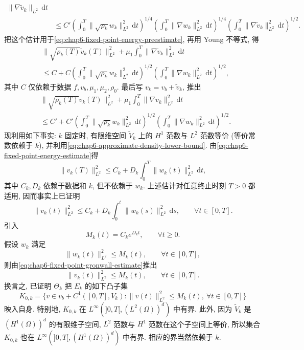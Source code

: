 \begin{sloppypar}
\begin{itemize}
\[\begin{aligned}
 \|\nabla\widetilde v_k\|_{L^2}\,\mathrm dt\\
 &\leq C'
 \left(\int_0^T\|\sqrt{\rho_k}w_k\|_{L^2}^2\,\mathrm dt\right)^{1/4}
 \left(\int_0^T\|\nabla w_k\|_{L^2}^2\,\mathrm dt\right)^{1/4}
 \left(\int_0^T\|\nabla\widetilde v_k\|_{L^2}^2\,\mathrm dt\right)^{1/2}.
 \end{aligned}
 \]
 把这个估计用于\eqref{eq:chap6-fixed-point-energy-preestimate}, 再用 Young 不等式, 得
 \[
 \begin{aligned}
 &\|\sqrt{\rho_k(T)}\widetilde v_k(T)\|_{L^2}^2
 +\mu_1\int_0^T\|\nabla\widetilde v_k\|_{L^2}^2\,\mathrm dt\\
 &\leq C+C
 \left(\int_0^T\|\sqrt{\rho_k}w_k\|_{L^2}^2\,\mathrm dt\right)^{1/2}
 \left(\int_0^T\|\nabla w_k\|_{L^2}^2\,\mathrm dt\right)^{1/2},
 \end{aligned}
 \]
 其中 $C$ 仅依赖于数据 $f,v_b,\mu_1,\mu_2,\rho_0$. 最后写 $v_k=v_b+\widetilde v_k$, 推出
 \begin{equation}
 \begin{aligned}
 &\|\sqrt{\rho_k(T)}v_k(T)\|_{L^2}^2
 +\mu_1\int_0^T\|\nabla v_k\|_{L^2}^2\,\mathrm dt\\
 &\leq C'+C'
 \left(\int_0^T\|\sqrt{\rho_k}w_k\|_{L^2}^2\,\mathrm dt\right)^{1/2}
 \left(\int_0^T\|\nabla w_k\|_{L^2}^2\,\mathrm dt\right)^{1/2}.
 \end{aligned}
 \label{eq:chap6-fixed-point-energy-estimate}
 \end{equation}
 现利用如下事实: $k$ 固定时, 有限维空间 $\widetilde V_k$ 上的 $H^1$ 范数与 $L^2$ 范数等价 (等价常数依赖于 $k$), 并利用\eqref{eq:chap6-approximate-density-lower-bound}. 由\eqref{eq:chap6-fixed-point-energy-estimate}得
 \[
  \|v_k(T)\|_{L^2}^2\leq C_k+D_k\int_0^T\|w_k(t)\|_{L^2}^2\,\mathrm dt,
 \]
 其中 $C_k,D_k$ 依赖于数据和 $k$, 但不依赖于 $w_k$. 上述估计对任意终止时刻 $T>0$ 都适用, 因而事实上已证明
 \begin{equation}
  \|v_k(t)\|_{L^2}^2\leq C_k+D_k\int_0^t\|w_k(s)\|_{L^2}^2\,\mathrm ds,
  \qquad\forall t\in[0,T].
 \label{eq:chap6-fixed-point-gronwall-estimate}
 \end{equation}
 引入
 \[
  M_k(t)=C_ke^{D_kt},\qquad\forall t\geq0.
 \]
 假设 $w_k$ 满足
 \[
  \|w_k(t)\|_{L^2}^2\leq M_k(t),\qquad\forall t\in[0,T],
 \]
 则由\eqref{eq:chap6-fixed-point-gronwall-estimate}推出
 \[
  \|v_k(t)\|_{L^2}^2\leq M_k(t),\qquad\forall t\in[0,T].
 \]
 换言之, 已证明 $\Theta_k$ 把 $E_k$ 的如下凸子集
 \[
  K_{0,k}=\{v\in v_b+C^1([0,T],V_k):
  \|v(t)\|_{L^2}^2\leq M_k(t),\ \forall t\in[0,T]\}
 \]
 映入自身. 特别地, $K_{0,k}$ 在 $L^\infty(]0,T[,(L^2(\Omega))^d)$ 中有界. 此外, 因为 $\widetilde V_k$ 是 $(H^1(\Omega))^d$ 的有限维子空间, $L^2$ 范数与 $H^1$ 范数在这个子空间上等价, 所以集合 $K_{0,k}$ 也在 $L^\infty(]0,T[,(H^1(\Omega))^d)$ 中有界. 相应的界当然依赖于 $k$.


\end{itemize}
\end{sloppypar}
